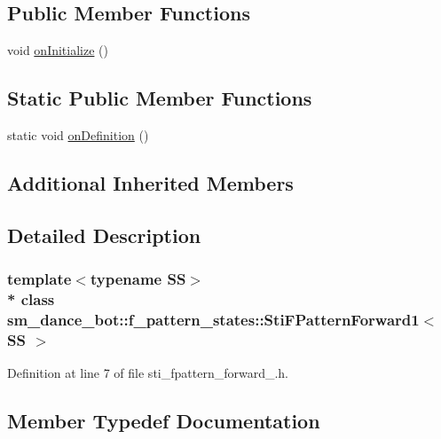\subsection*{Public Member Functions}
\begin{DoxyCompactItemize}
\item 
void \hyperlink{structsm__dance__bot_1_1f__pattern__states_1_1StiFPatternForward1_a52e3a365ed227fa64996feefb4466df1}{on\+Initialize} ()
\end{DoxyCompactItemize}
\subsection*{Static Public Member Functions}
\begin{DoxyCompactItemize}
\item 
static void \hyperlink{structsm__dance__bot_1_1f__pattern__states_1_1StiFPatternForward1_a4a90b9dc4b902afc74873828b7383337}{on\+Definition} ()
\end{DoxyCompactItemize}
\subsection*{Additional Inherited Members}


\subsection{Detailed Description}
\subsubsection*{template$<$typename SS$>$\\*
class sm\+\_\+dance\+\_\+bot\+::f\+\_\+pattern\+\_\+states\+::\+Sti\+F\+Pattern\+Forward1$<$ S\+S $>$}



Definition at line 7 of file sti\+\_\+fpattern\+\_\+forward\+\_.\+h.



\subsection{Member Typedef Documentation}
